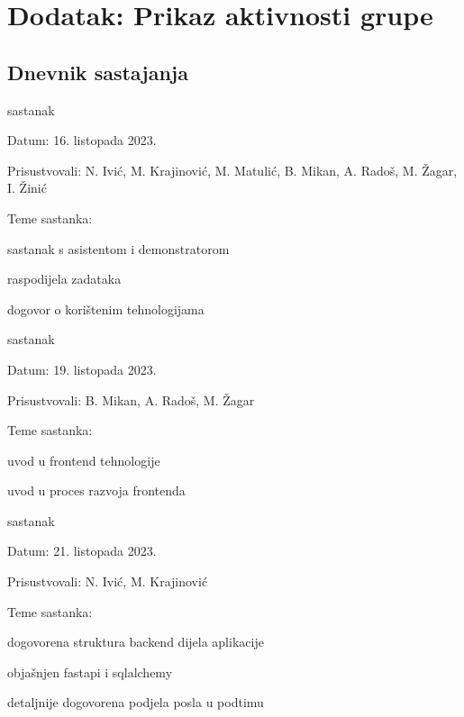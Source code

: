 \chapter*{Dodatak: Prikaz aktivnosti grupe}
		
		\section*{Dnevnik sastajanja}
		
		
		\begin{packed_enum}
			\item  sastanak
			
			\item[] \begin{packed_item}
				\item Datum: 16. listopada 2023.
				\item Prisustvovali: N. Ivić, M. Krajinović, M. Matulić, B. Mikan, A. Radoš, M. Žagar, I. Žinić
				\item Teme sastanka:
				\begin{packed_item}
					\item  sastanak s asistentom i demonstratorom
					\item  raspodijela zadataka 
					\item  dogovor o korištenim tehnologijama
				\end{packed_item}
			\end{packed_item}
			
			\item  sastanak
			\item[] \begin{packed_item}
				\item Datum: 19. listopada 2023.
				\item Prisustvovali: B. Mikan, A. Radoš, M. Žagar
				\item Teme sastanka:
				\begin{packed_item}
					\item  uvod u frontend tehnologije
					\item  uvod u proces razvoja frontenda
				\end{packed_item}
			\end{packed_item}
			
			\item  sastanak
			\item[] \begin{packed_item}
				\item Datum: 21. listopada 2023.
				\item Prisustvovali: N. Ivić, M. Krajinović
				\item Teme sastanka:
				\begin{packed_item}
					\item  dogovorena struktura backend dijela aplikacije
					\item  objašnjen fastapi i sqlalchemy
					\item  detaljnije dogovorena podjela posla u podtimu
				\end{packed_item}
			\end{packed_item}


\end{packed_enum}
